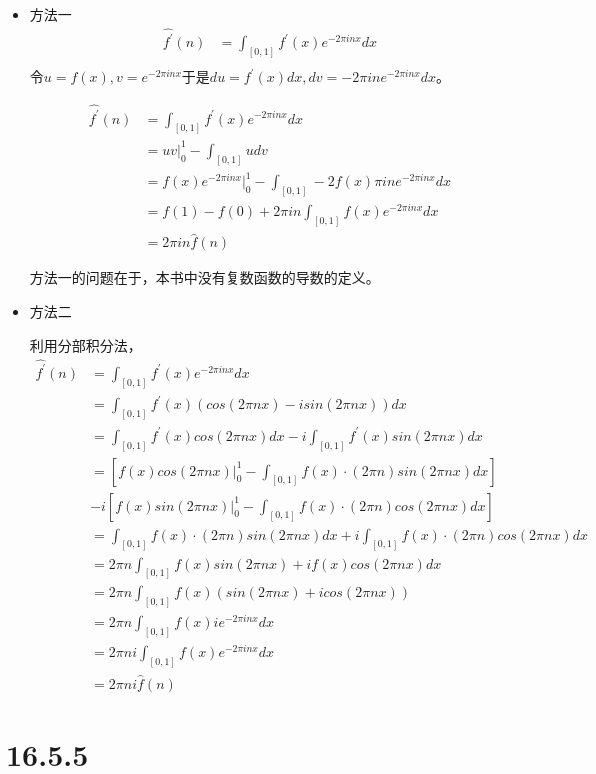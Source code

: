 \documentclass{article}
\begin{document}
\begin{itemize}
  \item 方法一
        \begin{align*}
          \hat{f^\prime}(n)
           & = \int_{[0, 1]} f^\prime(x) e^{-2\pi i nx} dx \\
        \end{align*}
        令$u = f(x), v = e^{-2\pi i nx}$于是$du = f^\prime (x)dx, dv = -2\pi i n e^{-2\pi i nx}dx$。

        \begin{align*}
          \hat{f^\prime}(n)
           & = \int_{[0, 1]} f^\prime(x) e^{-2\pi i nx} dx                                  \\
           & = uv|_{0}^1 - \int_{[0, 1]} u dv                                               \\
           & = f(x) e^{-2\pi i nx} |_{0}^1 - \int_{[0, 1]} -2 f(x) \pi i n e^{-2\pi i nx}dx \\
           & = f(1) - f(0) + 2\pi i n \int_{[0, 1]} f(x) e^{-2\pi i nx}dx                   \\
           & = 2\pi i n \hat{f}(n)
        \end{align*}

        方法一的问题在于，本书中没有复数函数的导数的定义。

  \item 方法二

        利用分部积分法，
        \begin{align*}
          \hat{f^\prime}(n)
           & = \int_{[0, 1]} f^\prime(x) e^{-2\pi i nx} dx                                                          \\
           & = \int_{[0, 1]} f^\prime(x) (cos(2\pi nx) - isin(2\pi nx)) dx                                          \\
           & = \int_{[0, 1]} f^\prime(x) cos(2\pi nx)dx - i \int_{[0, 1]} f^\prime(x) sin(2\pi nx)dx                \\
           & = \left[f(x)cos(2\pi n x)|_0^1 - \int_{[0, 1]} f(x) \cdot (2\pi n)sin(2\pi n x)dx\right]               \\
           & - i\left[f(x)sin(2\pi n x)|_0^1 - \int_{[0, 1]} f(x) \cdot (2\pi n)cos(2\pi n x)dx\right]              \\
           & = \int_{[0, 1]} f(x) \cdot (2\pi n)sin(2\pi n x)dx + i\int_{[0, 1]} f(x) \cdot (2\pi n)cos(2\pi n x)dx \\
           & = 2\pi n \int_{[0, 1]} f(x) sin(2\pi n x) + if(x)cos(2\pi n x) dx                                      \\
           & = 2\pi n \int_{[0, 1]} f(x)(sin(2\pi n x) + icos(2\pi n x))                                            \\
           & = 2\pi n \int_{[0, 1]} f(x)ie^{-2\pi i nx} dx                                                          \\
           & = 2\pi n i \int_{[0, 1]} f(x)e^{-2\pi i nx} dx                                                         \\
           & = 2\pi n i \hat{f}(n)
        \end{align*}

\end{itemize}

\section*{16.5.5}
\end{document}
